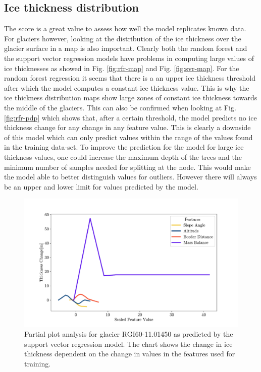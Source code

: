 \subsection{Ice thickness distribution}\label{disc-vol-dist}
The score is a great value to assess how well the model replicates known data. For glaciers however, looking at the distribution of the ice thickness over the glacier surface in a map is also important. Clearly both the random forest and the support vector regression models have problems in computing large values of ice thicknesses as showed in Fig. \ref{fig:rfr-map} and Fig. \ref{fig:svr-map}. For the random forest regression it seems that there is a an upper ice thickness threshold after which the model computes a constant ice thickness value. This is why the ice thickness distribution maps show large zones of constant ice thickness towards the middle of the glaciers. This can also be confirmed when looking at Fig. \ref{fig:rfr-pdp} which shows that, after a certain threshold, the model predicts no ice thickness change for any change in any feature value. This is clearly a downside of this model which can only predict values within the range of the values found in the training data-set. To improve the prediction for the model for large ice thickness values, one could increase the maximum depth of the trees and the minimum number of samples needed for splitting at the node. This would make the model able to better distinguish values for outliers. However there will always be an upper and lower limit for values predicted by the model.

\begin{figure}[!tp]
	\centering		  
	\includegraphics[width=1.\textwidth]{figures/SVR_low_thick_pdp.pdf}
	\caption{Partial plot analysis for glacier RGI60-11.01450 as predicted by the support vector regression model. The chart shows the change in ice thickness dependent on the change in values in the features used for training.}
	\label{fig:svr-pdp-low-thick}
\end{figure}

